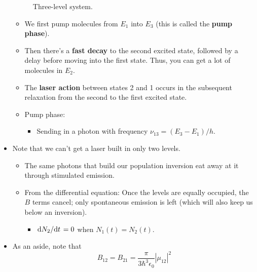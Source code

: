 \documentclass[../notes.tex]{subfiles}
\begin{document}
\begin{itemize}
\begin{figure}[h!]
        \caption{Three-level system.}
        \label{fig:3LevelSystem}
    \end{figure}
    \begin{itemize}
        \item We first pump molecules from $E_1$ into $E_3$ (this is called the \textbf{pump phase}).
        \item Then there's a \textbf{fast decay} to the second excited state, followed by a delay before moving into the first state. Thus, you can get a lot of molecules in $E_2$.
        \item The \textbf{laser action} between states 2 and 1 occurs in the subsequent relaxation from the second to the first excited state.
        \item Pump phase:
        \begin{itemize}
            \item Sending in a photon with frequency $\nu_{13}=(E_3-E_1)/h$.
        \end{itemize}
    \end{itemize}
    \item Note that we can't get a laser built in only two levels.
    \begin{itemize}
        \item The same photons that build our population inversion eat away at it through stimulated emission.
        \item From the differential equation: Once the levels are equally occupied, the $B$ terms cancel; only spontaneous emission is left (which will also keep us below an inversion).
        \begin{itemize}
            \item $\dv*{N_2}{t}=0$ when $N_1(t)=N_2(t)$.
        \end{itemize}
    \end{itemize}
    \item As an aside, note that
    \begin{equation*}
        B_{12} = B_{21} = \frac{\pi}{3\hbar^3\epsilon_0}|\mu_{12}|^2

\end{equation*}
\end{itemize}
\end{document}
